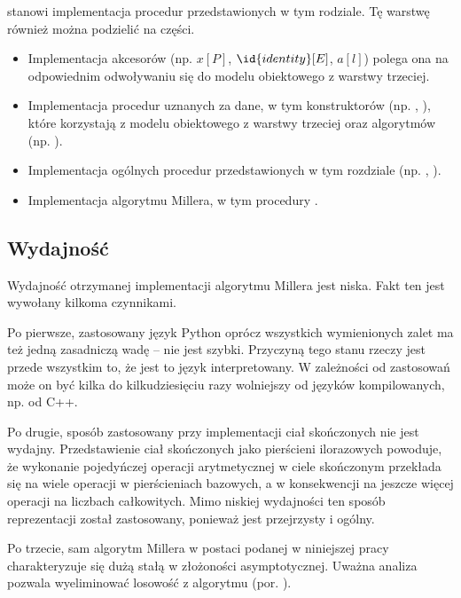 \begin{enumerate}
stanowi implementacja procedur przedstawionych w tym rodziale.
Tę warstwę również można podzielić na części.
\begin{itemize}
\item
Implementacja akcesorów (np. $x[P]$, $\id{identity}[E]$, $a[l]$)
polega ona na odpowiednim odwoływaniu się
do modelu obiektowego z warstwy trzeciej.
\item
Implementacja procedur uznanych za dane,
w tym konstruktorów
(np. ,
),
które korzystają z modelu obiektowego z warstwy trzeciej
oraz algorytmów
(np. ).
\item
Implementacja ogólnych procedur przedstawionych w tym rozdziale
(np. ,
).
\item
Implementacja algorytmu Millera,
w tym procedury .
\end{itemize}
\end{enumerate}

\subsection*{Wydajność}

\noindent
Wydajność otrzymanej implementacji algorytmu Millera jest niska.
Fakt ten jest wywołany kilkoma czynnikami.

\noindent
Po pierwsze, zastosowany język Python oprócz wszystkich wymienionych zalet
ma też jedną zasadniczą wadę -- nie jest szybki.
Przyczyną tego stanu rzeczy jest przede wszystkim to,
że jest to język interpretowany.
W zależności od zastosowań może on być kilka do kilkudziesięciu razy
wolniejszy od języków kompilowanych, np. od C++.

\noindent
Po drugie, sposób zastosowany przy implementacji ciał skończonych
nie jest wydajny.
Przedstawienie ciał skończonych jako pierścieni ilorazowych powoduje,
że wykonanie pojedyńczej operacji arytmetycznej w ciele skończonym
przekłada się na wiele operacji w pierścieniach bazowych,
a w konsekwencji na jeszcze więcej operacji na liczbach całkowitych.
Mimo niskiej wydajności ten sposób reprezentacji został zastosowany,
ponieważ jest przejrzysty i ogólny.

\noindent
Po trzecie, sam algorytm Millera w postaci podanej w niniejszej pracy
charakteryzuje się dużą stałą w złożoności asymptotycznej.
Uważna analiza pozwala wyeliminować losowość z algorytmu (por. \cite{miller}).

